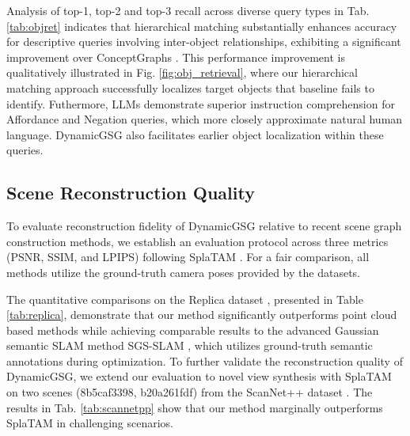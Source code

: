 Analysis of top-1, top-2 and top-3 recall across diverse query types in Tab. \ref{tab:objret} indicates that hierarchical matching substantially enhances accuracy for descriptive queries involving inter-object relationships, exhibiting a significant improvement over ConceptGraphs \cite{gu2023conceptgraphsopenvocabulary3dscene}. This performance improvement is qualitatively illustrated in Fig. \ref{fig:obj_retrieval},
where our hierarchical matching approach successfully localizes target objects that baseline fails to identify. Futhermore, LLMs demonstrate superior instruction comprehension for Affordance and Negation queries, which more closely approximate natural human language. DynamicGSG also facilitates earlier object localization within these queries. 

\subsection{Scene Reconstruction Quality}
\label{subsec:reconstruction_quality}

To evaluate reconstruction fidelity of DynamicGSG relative to recent scene graph construction methods, we establish an evaluation protocol across three metrics (PSNR, SSIM, and LPIPS) following SplaTAM \cite{keetha2024splatam}. For a fair comparison, all methods utilize the ground-truth camera poses provided by the datasets. 


The quantitative comparisons on the Replica dataset \cite{replica19arxiv}, presented in Table \ref{tab:replica}, demonstrate that our method significantly outperforms point cloud based methods \cite{gu2023conceptgraphsopenvocabulary3dscene,werby23hovsg} while achieving comparable results to the advanced Gaussian semantic SLAM method SGS-SLAM \cite{Li_2024}, which utilizes ground-truth semantic annotations during optimization. To further validate the reconstruction quality of DynamicGSG, we extend our evaluation to novel view synthesis with SplaTAM on two scenes (8b5caf3398, b20a261fdf) from the ScanNet++ dataset \cite{yeshwanthliu2023scannetpp}. The results in Tab. \ref{tab:scannetpp} show that our method marginally outperforms SplaTAM in challenging scenarios.

